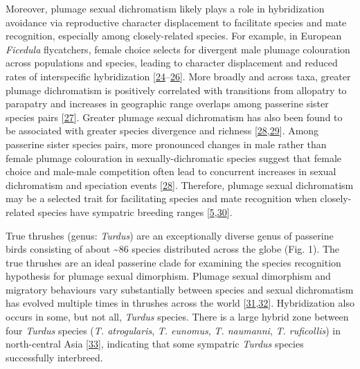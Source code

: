 \documentclass[
  a4paper,
]{article}
\begin{document}
Moreover, plumage sexual dichromatism likely plays a role in
hybridization avoidance via reproductive character displacement to
facilitate species and mate recognition, especially among
closely-related species. For example, in European \emph{Ficedula}
flycatchers, female choice selects for divergent male plumage
colouration across populations and species, leading to character
displacement and reduced rates of interspecific hybridization
{[}\protect\hyperlink{ref-alatalo1994}{24}--\protect\hyperlink{ref-laaksonen2015}{26}{]}.
More broadly and across taxa, greater plumage dichromatism is positively
correlated with transitions from allopatry to parapatry and increases in
geographic range overlaps among passerine sister species pairs
{[}\protect\hyperlink{ref-cooney2017}{27}{]}. Greater plumage sexual
dichromatism has also been found to be associated with greater species
divergence and richness
{[}\protect\hyperlink{ref-seddon2013}{28},\protect\hyperlink{ref-cooney2019}{29}{]}.
Among passerine sister species pairs, more pronounced changes in male
rather than female plumage colouration in sexually-dichromatic species
suggest that female choice and male-male competition often lead to
concurrent increases in sexual dichromatism and speciation events
{[}\protect\hyperlink{ref-seddon2013}{28}{]}. Therefore, plumage sexual
dichromatism may be a selected trait for facilitating species and mate
recognition when closely-related species have sympatric breeding ranges
{[}\protect\hyperlink{ref-martin2015a}{5},\protect\hyperlink{ref-martin2010}{30}{]}.

True thrushes (genus: \emph{Turdus}) are an exceptionally diverse genus
of passerine birds consisting of about \textasciitilde86 species
distributed across the globe (Fig. 1). The true thrushes are an ideal
passerine clade for examining the species recognition hypothesis for
plumage sexual dimorphism. Plumage sexual dimorphism and migratory
behaviours vary substantially between species and sexual dichromatism
has evolved multiple times in thrushes across the world
{[}\protect\hyperlink{ref-clement2000}{31},\protect\hyperlink{ref-nagy2019}{32}{]}.
Hybridization also occurs in some, but not all, \emph{Turdus} species.
There is a large hybrid zone between four \emph{Turdus} species
(\emph{T. atrogularis}, \emph{T. eunomus}, \emph{T. naumanni}, \emph{T.
ruficollis}) in north-central Asia
{[}\protect\hyperlink{ref-mccarthy2006}{33}{]}, indicating that some
sympatric \emph{Turdus} species successfully interbreed.
\end{document}
